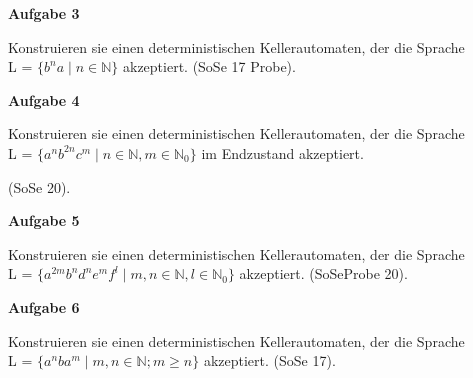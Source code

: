 \documentclass[a4paper,12pt]{article}
\newcommand{\Aufgabe}[1]{
  {
  \vspace*{0.5cm}
  \textsf{\textbf{Aufgabe #1}}
  \vspace*{0.2cm}
  
  }
}
\begin{document}
\Aufgabe{3}

Konstruieren sie einen deterministischen Kellerautomaten, der die Sprache\\ L = $\{b^n a \mid n \in \mathbb{N}\} $ akzeptiert.   
(SoSe 17 Probe).

\Aufgabe{4}
Konstruieren sie einen deterministischen Kellerautomaten, der die Sprache\\ L = $\{a^n b^{2n} c^m \mid n \in \mathbb{N}, m \in \mathbb{N}_0\} $ im Endzustand akzeptiert.   

(SoSe 20).

\Aufgabe{5}

Konstruieren sie einen deterministischen Kellerautomaten, der die Sprache\\ L = $\{a^{2m} b^{n} d^n e^m f^l \mid m,n \in \mathbb{N}, l \in \mathbb{N}_0\} $  akzeptiert.   
(SoSeProbe 20).

\Aufgabe{6}

Konstruieren sie einen deterministischen Kellerautomaten, der die Sprache\\ L = $\{a^{n} b a^m \mid m,n \in \mathbb{N}; m \geq n \} $  akzeptiert.   
(SoSe 17).

\end{document}
